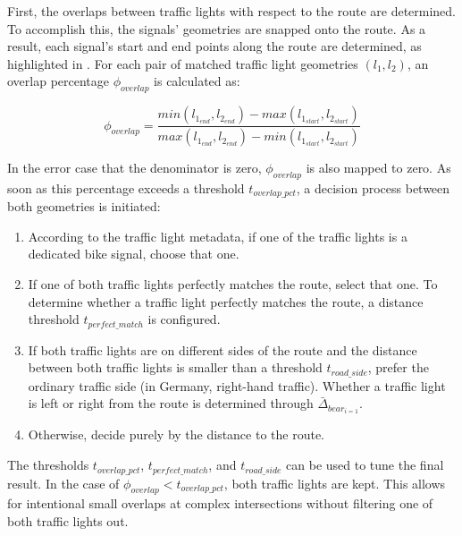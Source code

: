 First, the overlaps between traffic lights with respect to the route are determined. To accomplish this, the signals' geometries are snapped onto the route. As a result, each signal's start and end points along the route are determined, as highlighted in . For each pair of matched traffic light geometries $(l_1, l_2)$, an overlap percentage $\phi_{overlap}$ is calculated as:

\begin{equation}
    \phi_{overlap} = \frac{min(l_{1_{end}}, l_{2_{end}}) - max(l_{1_{start}}, l_{2_{start}})}{max(l_{1_{end}}, l_{2_{end}}) - min(l_{1_{start}}, l_{2_{start}})}
\end{equation}

In the error case that the denominator is zero, $\phi_{overlap}$ is also mapped to zero. As soon as this percentage exceeds a threshold $t_{overlap\_pct}$, a decision process between both geometries is initiated:

\begin{enumerate}
    \item According to the traffic light metadata, if one of the traffic lights is a dedicated bike signal, choose that one.
    \item If one of both traffic lights perfectly matches the route, select that one. To determine whether a traffic light perfectly matches the route, a distance threshold $t_{perfect\_match}$ is configured.
    \item If both traffic lights are on different sides of the route and the distance between both traffic lights is smaller than a threshold $t_{road\_side}$, prefer the ordinary traffic side (in Germany, right-hand traffic). Whether a traffic light is left or right from the route is determined through $\bar{\Delta}_{bear_{i=1}}$.
    \item Otherwise, decide purely by the distance to the route.
\end{enumerate}

The thresholds $t_{overlap\_pct}$, $t_{perfect\_match}$, and $t_{road\_side}$ can be used to tune the final result. In the case of $\phi_{overlap} < t_{overlap\_pct}$, both traffic lights are kept. This allows for intentional small overlaps at complex intersections without filtering one of both traffic lights out.

